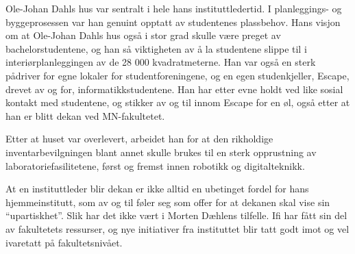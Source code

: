 Ole-Johan Dahls hus var sentralt i hele hans instituttledertid. I planleggings- og byggeprosessen var han genuint opptatt av studentenes plassbehov. Hans visjon om at Ole-Johan Dahls hus også i stor grad skulle være preget av bachelorstudentene, og han så viktigheten av å la studentene slippe til i interiørplanleggingen av de 28 000 kvadratmeterne. Han var også en sterk pådriver for egne lokaler for studentforeningene, og en egen studenkjeller, Escape, drevet av og for, informatikkstudentene. Han har etter evne holdt ved like sosial kontakt med studentene, og stikker av og til innom Escape for en øl, også etter at han er blitt dekan ved MN-fakultetet.

Etter at huset var overlevert, arbeidet han for at den rikholdige inventarbevilgningen blant annet skulle brukes til en sterk opprustning av laboratoriefasilitetene, først og fremst innen robotikk og digitalteknikk.

At en instituttleder blir dekan er ikke alltid en ubetinget fordel for hans hjemmeinstitutt, som av og til føler seg som offer for at dekanen skal vise sin ``upartiskhet''. Slik har det ikke vært i Morten Dæhlens tilfelle. Ifi har fått sin del av fakultetets ressurser, og nye initiativer fra instituttet blir tatt
godt imot og vel ivaretatt på fakultetsnivået.

